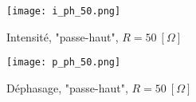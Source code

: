 \begin{minipage}{.5\textwidth}
\begin{figure}[H]
\centering
\texttt{[image: i\_ph\_50.png]}
\caption{Intensité, "passe-haut", $R = 50 \ [ \Omega ]$}
\end{figure}
\end{minipage}
\begin{minipage}{.5\textwidth}
\begin{figure}[H]
\centering
\texttt{[image: p\_ph\_50.png]}
\caption{Déphasage, "passe-haut", $R = 50 \ [ \Omega ]$}
\end{figure}
\end{minipage}